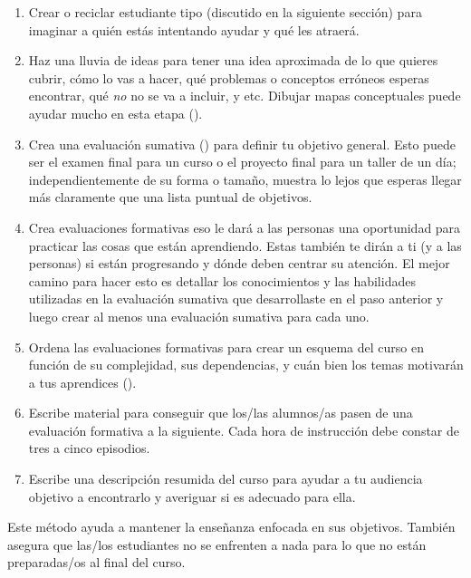 \begin{enumerate}
 
\item
Crear o reciclar estudiante tipo (discutido en la siguiente sección)
para imaginar a quién estás intentando ayudar y qué les atraerá.

 \item
Haz una lluvia de ideas para tener una idea aproximada de lo que quieres cubrir,
cómo lo vas a hacer,
qué problemas o conceptos erróneos esperas encontrar,
qué \emph{no} no se va a incluir,
y etc.
Dibujar mapas conceptuales puede ayudar mucho en esta etapa ().
 
\item
Crea una evaluación sumativa ()
para definir tu objetivo general.
Esto puede ser el examen final para un curso
o el proyecto final para un taller de un día;
independientemente de su forma o tamaño,
muestra lo lejos que esperas llegar
más claramente que una lista puntual de objetivos.
 
\item
Crea evaluaciones formativas
eso le dará a las personas una oportunidad para practicar las cosas que están aprendiendo.
Estas también te dirán a ti (y a las personas) si están progresando
y dónde deben centrar su atención.
El mejor camino para hacer esto es detallar los conocimientos y las habilidades 
utilizadas en la evaluación sumativa que desarrollaste en el paso anterior y 
luego crear al menos una evaluación sumativa para cada uno.
 
\item
Ordena las evaluaciones formativas para crear un esquema del curso
en función de su complejidad,
sus dependencias,
y cuán bien los temas motivarán a tus aprendices ().
 
\item
Escribe material para conseguir que los/las alumnos/as pasen de una evaluación formativa a la siguiente.
Cada hora de instrucción debe constar de tres a cinco episodios.
 
\item
Escribe una descripción resumida del curso
para ayudar a tu audiencia objetivo a encontrarlo
y averiguar si es adecuado para ella.
 \end{enumerate}
 
Este método ayuda a mantener la enseñanza enfocada en sus objetivos.
También asegura que las/los estudiantes no se enfrenten a nada para lo que no están preparadas/os al final del curso.
 
